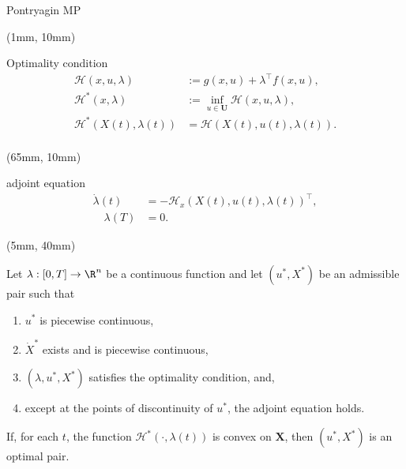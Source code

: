 \begin{frame}{Pontryagin MP}
    \begin{textblock*}{60mm}(1mm, 10mm)
        \begin{beamerboxesrounded}{Optimality condition}
            \begin{equation*}
                \begin{aligned}
                    \mathcal{H}(x,u,\lambda)
                        &:= g(x,u) + \lambda^\top f(x,u),
                    \\
                    \mathcal{H}^\ast(x,\lambda)  
                        &:= \inf_{u\in\mathbf{U}}\mathcal{H}(x,u,\lambda),
                    \\
                    \mathcal{H}^\ast(X(t),\lambda(t)) 
                        &=
                    \mathcal{H}(X(t),u(t),\lambda(t)).
                    \\
                \end{aligned}
            \end{equation*}
        \end{beamerboxesrounded}
    \end{textblock*}
    
    \begin{textblock*}{60mm}(65mm, 10mm)
        \begin{beamerboxesrounded}{adjoint equation}
            \begin{align*}
                 \dot{\lambda}(t) &= -\mathcal{H}_x(X(t),u(t),\lambda(t))^\top, 
                 \\
                 \quad \lambda(T) &=0.
            \end{align*}
        \end{beamerboxesrounded}
    \end{textblock*}
%
%
%
%
    \begin{textblock*}{120mm}(5mm, 40mm)
        \begin{theorem} 
            Let $\lambda:[0,T]\to \R^n$  be a continuous function 
            and let $(u^\ast,X^\ast)$ be an admissible pair such that 
            \begin{enumerate}[\rm (i)]
                \item 
                    $u^\ast$ is piecewise continuous,
                \item 
                    $\dot{X}^\ast$ exists and is piecewise continuous,
                \item 
                    $(\lambda,u^\ast,X^\ast)$ satisfies the optimality 
                    condition, and,
                \item 
                    except at the points of discontinuity of $u^\ast$, the 
                    adjoint equation holds.
            \end{enumerate}
            If, for each $t$, the function $\mathcal{H}^\ast(\cdot,\lambda(t))$ 
            is convex on $\mathbf{X}$, then $(u^\ast,X^\ast)$ is an optimal
            pair.
        \end{theorem}
    \end{textblock*}
\end{frame}

